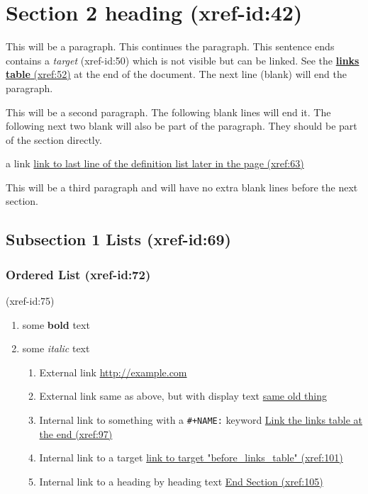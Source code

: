 \documentclass[11pt]{article}
\begin{document}
\section{Section 2 heading   (xref-id:42)  }
 \label{obj-42}
 \label{obj-41}
\begin{quote}
\end{quote}

This will be a paragraph.
This continues the paragraph. This sentence ends contains a
\emph{target}
\label{obj-50} (xref-id:50)
which is not visible but can be linked. See the
\hyperref[obj-385]{\textbf{links table} (xref:52)}
at the end of the document.  The next line (blank) will end the
paragraph.

This will be a second paragraph. 
The following blank lines will end it.
The following next two blank will also be part of the paragraph.
They should be part of the section directly.

a link
\hyperref[obj-164]{link to last line of the definition list later in the page (xref:63)}

\vspace{\baselineskip}
This will be a third paragraph and will have no extra blank lines before the next section.

\subsection{Subsection 1 Lists   (xref-id:69)  }
 \label{obj-69}
 \label{obj-68}
\subsubsection{Ordered List   (xref-id:72)  }
 \label{obj-72}
 \label{obj-71}

 (xref-id:75)
\begin{enumerate} \label{obj-75}
\item
some
\textbf{bold}
text
\item
some
\emph{italic}
text
\begin{enumerate}
\item
External link
\href{http://example.com}{http://example.com}
\item
External link same as above, but with display text
\href{http://example.com}{same old thing}
\item
Internal link to something with a
\texttt{\#+NAME:}
keyword
\hyperref[obj-385]{Link the links table at the end (xref:97)}
\item
Internal link to a target
\hyperref[obj-384]{link to target "before\_links\_table" (xref:101)}
\item
Internal link to a heading by heading text
\hyperref[obj-381]{End Section (xref:105)}
\end{enumerate}
\end{enumerate}
\end{document}
